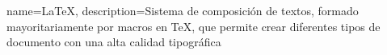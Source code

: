 \makeglossaries

{
    name={\LaTeX},
    description={Sistema de composición de textos, formado mayoritariamente por macros en \TeX, que permite crear diferentes tipos de documento con una alta calidad tipográfica}
}
